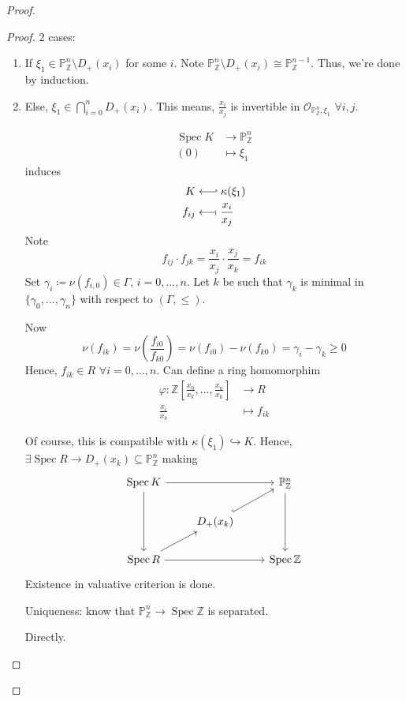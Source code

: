 \documentclass[12pt]{article}
\DeclareMathOperator{\Spec}{Spec}
\theoremstyle{definition}
\begin{document}
\begin{proof}
\begin{enumerate}[label=\arabic*)]
\begin{proof}
2 cases:

\begin{enumerate}[label=(\arabic*)]
\item If $\xi_1\in\mathbb{P}_{\mathbb{Z}}^n\setminus D_+(x_i)$ for some $i$. Note $\mathbb{P}_{\mathbb{Z}}^n\setminus D_+(x_i)\cong\mathbb{P}_{\mathbb{Z}}^{n-1}$. Thus, we're done by induction.

\item Else, $\xi_1\in\bigcap_{i=0}^nD_+(x_i)$. This means, $\frac{x_i}{x_j}$ is invertible in $\mathcal{O}_{\mathbb{P}_{\mathbb{Z}}^n,\xi_1}$ $\forall i,j$.

\begin{align*}
\Spec K&\longrightarrow\mathbb{P}_{\mathbb{Z}}^n\\
(0)&\longmapsto\xi_1
\end{align*}
induces
\begin{align*}
K&\longleftarrow\joinrel\rhook\kappa(\xi_1)\\
f_{ij}&\longleftarrow\!\shortmid\frac{x_i}{x_j}
\end{align*}
Note
\[f_{ij}\cdot f_{jk}=\frac{x_i}{x_j}\cdot\frac{x_j}{x_k}=f_{ik}\]
Set $\gamma_i\coloneqq\nu(f_{i,0})\in\Gamma$, $i=0,\ldots,n$. Let $k$ be such that $\gamma_k$ is minimal in $\{\gamma_0,\ldots,\gamma_n\}$ with respect to $(\Gamma,\leq)$.

Now
\[\nu(f_{ik})=\nu\left(\frac{f_{i0}}{f_{k0}}\right)=\nu(f_{i0})-\nu(f_{k0})=\gamma_i-\gamma_k\geq0\]
Hence, $f_{ik}\in R$ $\forall i=0,\ldots,n$. Can define a ring homomorphim
\begin{align*}
\varphi:\mathbb{Z}\left[\frac{x_0}{x_k},\ldots,\frac{x_n}{x_k}\right]&\longrightarrow R\\
\frac{x_i}{x_k}&\longmapsto f_{ik}
\end{align*}

Of course, this is compatible with $\kappa(\xi_1)\hookrightarrow K$. Hence, $\exists\Spec R\rightarrow D_+(x_k)\subseteq\mathbb{P}_{\mathbb{Z}}^n$ making
\[
\begin{tikzcd}
\Spec K\arrow[rr]\arrow[dd]&&\mathbb{P}_{\mathbb{Z}}^n\arrow[dd]\\
&D_+(x_k)\arrow[ru,hook]\\
\Spec R\arrow[ru]\arrow[rr]&&\Spec\mathbb{Z}
\end{tikzcd}
\]
Existence in valuative criterion is done.

Uniqueness: know that $\mathbb{P}_{\mathbb{Z}}^n\rightarrow\Spec\mathbb{Z}$ is separated.

Directly.
\end{enumerate}
\end{proof}
\end{enumerate}
\end{proof}
\end{document}
